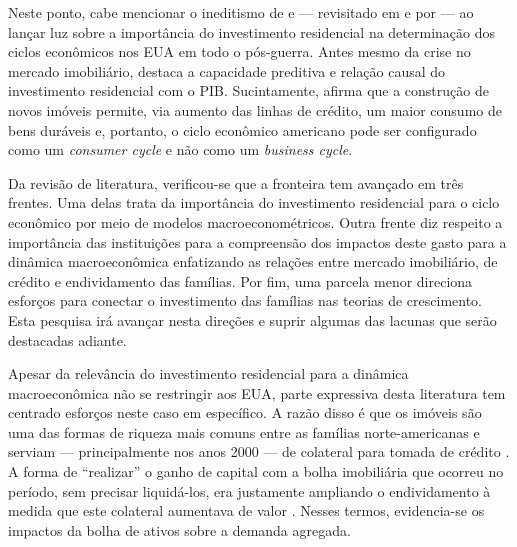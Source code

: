 Neste ponto, cabe mencionar o ineditismo de \textcite{green_follow_1997} e \textcite{leamer_housing_2007} --- revisitado em \textcite{leamer_housing_2015} e por \textcite{fiebiger_semi-autonomous_2018} --- ao lançar luz sobre a importância do investimento residencial na determinação dos ciclos econômicos nos EUA em todo o pós-guerra.
Antes mesmo da crise no mercado imobiliário,
\textcite{leamer_housing_2007} destaca a capacidade preditiva e relação causal  do investimento residencial com o PIB. Sucintamente, afirma que a construção de novos imóveis permite, via aumento das linhas de crédito, um maior consumo de bens duráveis e, portanto, o ciclo econômico americano pode ser configurado como um \textit{consumer cycle} e não como um \textit{business cycle}.

Da revisão de literatura, verificou-se que a fronteira tem avançado em três frentes. Uma delas trata da importância do investimento residencial para o ciclo econômico por meio de modelos macroeconométricos.
Outra frente  diz respeito a importância das instituições para a compreensão dos impactos deste gasto para a dinâmica macroeconômica enfatizando as relações entre mercado imobiliário, de crédito e endividamento das famílias. 
Por fim, uma parcela menor direciona esforços para conectar o investimento das famílias nas teorias de crescimento. Esta pesquisa irá avançar nesta direções e suprir algumas das lacunas que serão destacadas adiante.

Apesar da relevância do investimento residencial para a dinâmica macroeconômica não se restringir aos EUA, parte expressiva desta literatura tem centrado esforços neste caso em específico. A razão disso é que os imóveis são  uma das formas de riqueza mais comuns entre as famílias norte-americanas e serviam --- principalmente nos anos 2000 --- de colateral para tomada de crédito \cite{teixeira_uma_2011}. A forma de ``realizar'' o ganho de capital com a bolha imobiliária que ocorreu no período, sem precisar liquidá-los, era justamente ampliando o endividamento à medida que este colateral aumentava de valor \cite{teixeira_crescimento_2015}. Nesses termos, evidencia-se os impactos da bolha de ativos sobre a demanda agregada. 


